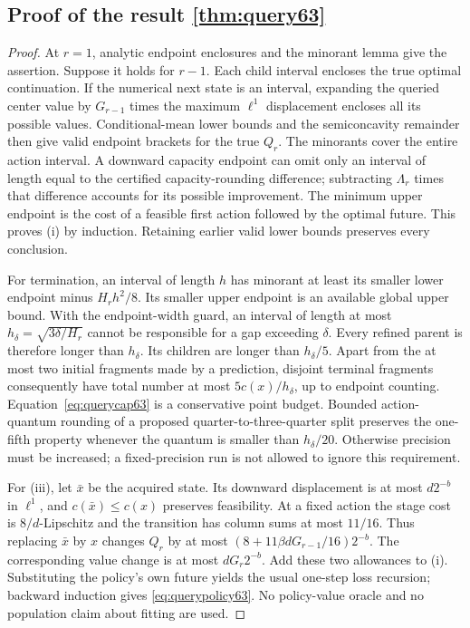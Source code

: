 \subsection{Proof of the result \ref{thm:query63}}\label{supp:proof-query63-2}
\begin{proof}
At $r=1$, analytic endpoint enclosures and the minorant lemma give the assertion. Suppose it holds for $r-1$. Each child interval encloses the true optimal continuation. If the numerical next state is an interval, expanding the queried center value by $G_{r-1}$ times the maximum $\ell^1$ displacement encloses all its possible values. Conditional-mean lower bounds and the semiconcavity remainder then give valid endpoint brackets for the true $Q_r$. The minorants cover the entire action interval. A downward capacity endpoint can omit only an interval of length equal to the certified capacity-rounding difference; subtracting $\Lambda_r$ times that difference accounts for its possible improvement. The minimum upper endpoint is the cost of a feasible first action followed by the optimal future. This proves (i) by induction. Retaining earlier valid lower bounds preserves every conclusion.

For termination, an interval of length $h$ has minorant at least its smaller lower endpoint minus $H_rh^2/8$. Its smaller upper endpoint is an available global upper bound. With the endpoint-width guard, an interval of length at most
$h_\delta=\sqrt{3\delta/H_r}$ cannot be responsible for a gap exceeding $\delta$. Every refined parent is therefore longer than $h_\delta$. Its children are longer than $h_\delta/5$. Apart from the at most two initial fragments made by a prediction, disjoint terminal fragments consequently have total number at most $5c(x)/h_\delta$, up to endpoint counting. Equation~\eqref{eq:querycap63} is a conservative point budget. Bounded action-quantum rounding of a proposed quarter-to-three-quarter split preserves the one-fifth property whenever the quantum is smaller than $h_\delta/20$. Otherwise precision must be increased; a fixed-precision run is not allowed to ignore this requirement.

For (iii), let $\bar x$ be the acquired state. Its downward displacement is at most $d2^{-b}$ in $\ell^1$, and $c(\bar x)\le c(x)$ preserves feasibility. At a fixed action the stage cost is $8/d$-Lipschitz and the transition has column sums at most $11/16$. Thus replacing $\bar x$ by $x$ changes $Q_r$ by at most $(8+11\beta dG_{r-1}/16)2^{-b}$. The corresponding value change is at most $dG_r2^{-b}$. Add these two allowances to (i). Substituting the policy's own future yields the usual one-step loss recursion; backward induction gives \eqref{eq:querypolicy63}. No policy-value oracle and no population claim about fitting are used.
\end{proof}

